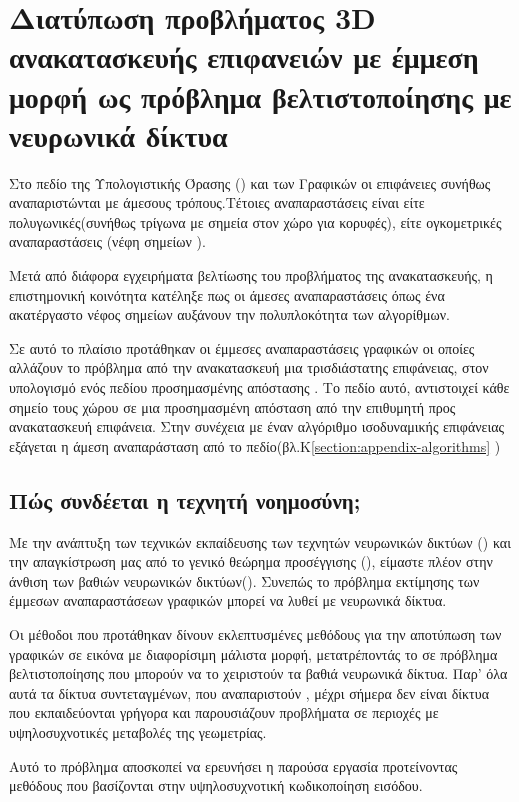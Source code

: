 \section{Διατύπωση προβλήματος 3D ανακατασκευής επιφανειών με έμμεση μορφή ως πρόβλημα βελτιστοποίησης με νευρωνικά δίκτυα}
\par
    Στο πεδίο της Υπολογιστικής Όρασης () και των  Γραφικών οι επιφάνειες συνήθως αναπαριστώνται με άμεσους τρόπους.Τέτοιες αναπαραστάσεις είναι είτε πολυγωνικές(συνήθως τρίγωνα με σημεία στον  χώρο για κορυφές), είτε ογκομετρικές αναπαραστάσεις (νέφη σημείων ).
\par
    Μετά από διάφορα εγχειρήματα βελτίωσης του προβλήματος της ανακατασκευής, η επιστημονική κοινότητα κατέληξε πως οι άμεσες αναπαραστάσεις όπως ένα ακατέργαστο νέφος σημείων αυξάνουν την πολυπλοκότητα των αλγορίθμων. 
\par
    Σε αυτό το πλαίσιο προτάθηκαν οι έμμεσες αναπαραστάσεις γραφικών οι οποίες αλλάζουν το πρόβλημα από την ανακατασκευή μια τρισδιάστατης επιφάνειας, στον υπολογισμό ενός πεδίου προσημασμένης απόστασης . Το πεδίο αυτό, αντιστοιχεί κάθε σημείο τους χώρου σε μια προσημασμένη απόσταση από την επιθυμητή προς ανακατασκευή επιφάνεια. Στην συνέχεια με έναν αλγόριθμο ισοδυναμικής επιφάνειας εξάγεται η άμεση αναπαράσταση από το πεδίο(βλ.Κ\ref{section:appendix-algorithms}  ) 
\subsection*{Πώς συνδέεται η τεχνητή νοημοσύνη;}
\par
    Με την ανάπτυξη των τεχνικών εκπαίδευσης των τεχνητών νευρωνικών δικτύων () και την απαγκίστρωση μας από το γενικό θεώρημα προσέγγισης (), είμαστε πλέον στην άνθιση των βαθιών νευρωνικών δικτύων(). Συνεπώς το πρόβλημα εκτίμησης των έμμεσων αναπαραστάσεων γραφικών μπορεί να λυθεί με νευρωνικά δίκτυα.
\par
    Οι μέθοδοι που προτάθηκαν δίνουν εκλεπτυσμένες μεθόδους για την αποτύπωση των γραφικών σε εικόνα με διαφορίσιμη μάλιστα μορφή, μετατρέποντάς το σε πρόβλημα βελτιστοποίησης που μπορούν να το χειριστούν τα βαθιά νευρωνικά δίκτυα. Παρ' όλα αυτά τα δίκτυα συντεταγμένων, που αναπαριστούν , μέχρι σήμερα δεν είναι δίκτυα που εκπαιδεύονται γρήγορα και παρουσιάζουν προβλήματα σε περιοχές με υψηλοσυχνοτικές μεταβολές της γεωμετρίας. 
\par    
    Αυτό το πρόβλημα αποσκοπεί να ερευνήσει η παρούσα εργασία προτείνοντας μεθόδους που βασίζονται στην υψηλοσυχνοτική κωδικοποίηση εισόδου.


